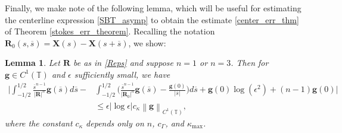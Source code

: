 \documentclass[11pt]{article}
\numberwithin{equation}{section}
\newcommand{\T}{\mathbb{T}}
\newcommand{\bars}{\overline s}
\newcommand{\X}{\bm{X}}
\newcommand{\abs}[1]{\left\lvert #1 \right\rvert}
\newcommand{\norm}[1]{\left\lVert #1 \right\rVert}
\newtheorem{lemma}[theorem]{Lemma}
\theoremstyle{definition}
\begin{document}
Finally, we make note of the following lemma, which will be useful for estimating the centerline expression \eqref{SBT_asymp} to obtain the estimate \eqref{center_err_thm} of Theorem \ref{stokes_err_theorem}. 
Recalling the notation $\bm{R}_0(s,\bars) = \X(s) - \X(s+\bars)$, we show:
\begin{lemma}\label{center_est_lem}
Let $\bm{R}$ be as in \eqref{Reps} and suppose $n= 1$ or $n=3$. Then for $\bm{g}\in C^1(\T)$ and $\epsilon$ sufficiently small, we have 
\begin{equation}\label{cent_lem_eq}
\begin{aligned}
\bigg|\int_{-1/2}^{1/2} \frac{\bars^{n-1}}{\abs{\bm{R}}^n}\bm{g}(\bars)d\bars - &\int_{-1/2}^{1/2} \bigg(\frac{\bars^{n-1}}{\abs{\bm{R}_0}^n} \bm{g}(\bars)-\frac{\bm{g}(0)}{\abs{\bars} } \bigg)d\bars + \bm{g}(0)\log(\epsilon^2) + (n-1)\bm{g}(0) \bigg| \\
& \le \epsilon \abs{\log\epsilon} c_\kappa\norm{\bm{g}}_{C^1(\T)},
\end{aligned}
\end{equation}
where the constant $c_\kappa$ depends only on $n$, $c_\Gamma$, and $\kappa_{\max}$. 
\end{lemma} 
\end{document}
